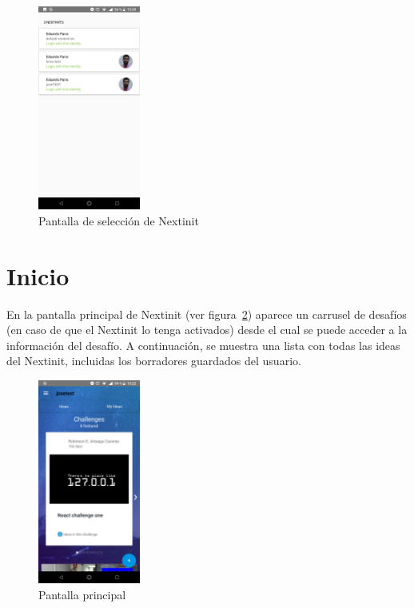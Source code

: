 \begin{figure}[!h]
	\begin{center}
		\includegraphics[width=0.3\textwidth]{./img/anexo1/seleccion_empresa.png}
		\caption{Pantalla de selección de Nextinit}
		\label{fig:seleccion_empresa}
	\end{center}
\end{figure}

\section{Inicio}
 
En la pantalla principal de Nextinit (ver figura~\ref{fig:inicio}) aparece un carrusel de desafíos 
(en caso de que el Nextinit lo tenga activados) desde el cual se puede acceder a la información 
del desafío. A continuación, se muestra una lista con todas las ideas del Nextinit, incluidas los 
borradores guardados del usuario.

\begin{figure}[!h]
	\begin{center}
		\includegraphics[width=0.3\textwidth]{./img/anexo1/inicio.png}
		\caption{Pantalla principal}
		\label{fig:inicio}
	\end{center}
\end{figure}

